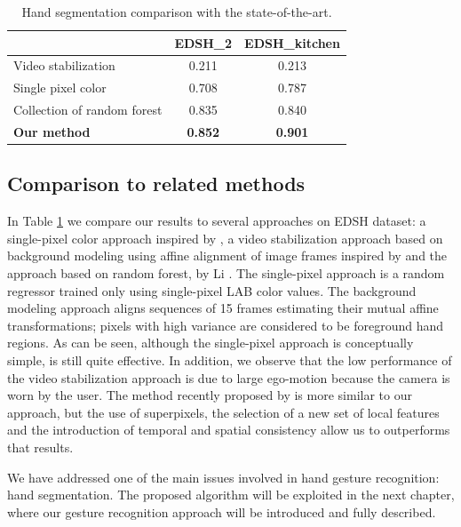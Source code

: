 \begin{table}
 \centering
 \begin{tabular}{|l|c|c|}
 \hline
  	& \textbf{EDSH\_2}	& \textbf{EDSH\_{kitchen}} \\ \hline\hline
Video stabilization  \cite{hayman03} 	& 0.211 & 0.213		\\ \hline
Single pixel color \cite{jones99}	& 0.708 &	0.787	\\ \hline  
Collection of random forest \cite{li13} & 0.835 & 0.840		\\ \hline  
\textbf{Our method} & \textbf{0.852} &	\textbf{0.901}	\\ \hline 
\end{tabular}
\caption{Hand segmentation comparison with the state-of-the-art.}\label{tab:comparision_hand}
\end{table}



\subsection{Comparison to related methods}

In Table \ref{tab:comparision_hand} we compare our results to several approaches on EDSH dataset: a single-pixel color approach inspired by \cite{jones99}, a video stabilization approach based on background modeling using affine alignment of image frames inspired by
\cite{hayman03} and the approach based on random forest, by Li \etal \cite{li13}. 
The single-pixel approach is a random regressor trained only using single-pixel LAB color values. 
The background modeling approach aligns sequences of 15 frames estimating their mutual affine transformations; pixels with high variance are considered to be foreground hand regions. 
As can be seen, although the single-pixel approach is conceptually simple, is still quite effective. In addition, we observe that the low performance of the video stabilization approach is due to large ego-motion because the camera is worn by the user.     
The method recently proposed by \cite{li13} is more similar to our approach, but the use of superpixels, the selection of a new set of local features and the introduction of temporal and spatial consistency allow us to outperforms that results.

\medskip
We have addressed one of the main issues involved in hand gesture recognition: hand segmentation. The proposed algorithm will be exploited in the next chapter, where our gesture recognition approach will be introduced and fully described.
